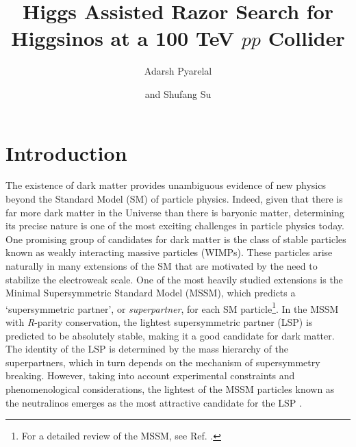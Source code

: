\documentclass[a4paper,11pt]{article}
\title{Higgs Assisted Razor Search for Higgsinos at a 100 TeV $pp$ Collider}
\author[a]{Adarsh Pyarelal}
\author[b]{and Shufang Su}
\affiliation[a]{School of Information, University of Arizona, Tucson, AZ 85721 , USA}
\affiliation[b]{Department of Physics, University of Arizona, Tucson, AZ 85718, USA}
\begin{document}
\maketitle

\section{Introduction}

The existence of dark matter provides unambiguous evidence of new physics
beyond the Standard Model (SM) of particle physics. Indeed, given that there is
far more dark matter in the Universe than there is baryonic matter, determining
its precise nature is one of the most exciting challenges in particle physics
today.  One promising group of candidates for dark matter is the class of stable
particles known as weakly interacting massive particles (WIMPs). These
particles arise naturally in many extensions of the SM that are motivated by
the need to stabilize the electroweak scale. One of the most heavily studied extensions
is the Minimal Supersymmetric Standard Model (MSSM), which predicts a
`supersymmetric partner', or \emph{superpartner}, for each SM
particle\footnote{For a detailed review of the MSSM, see Ref.
\cite{Martin:1997ns}.}. In the MSSM with \emph{R}-parity conservation, the
lightest supersymmetric partner (LSP) is predicted to be absolutely stable,
making it a good candidate for dark matter. The identity of the LSP is
determined by the mass hierarchy of the superpartners, which in turn depends on
the mechanism of supersymmetry breaking.  However, taking into account experimental
constraints and phenomenological considerations, the lightest of the MSSM
particles known as the neutralinos emerges as the most attractive candidate
for the LSP \cite{Bertone:2004pz}. 
\end{document}
